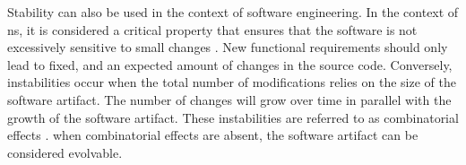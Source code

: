 Stability can also be used in the context of software engineering. In the context of
\gls{ns}, it is considered a critical property that ensures that the software is not
excessively sensitive to small changes \parencite[270]{mannaert_normalized_2016}. New
functional requirements should only lead to fixed, and an expected amount of changes in
the source code. Conversely, instabilities occur when the total number of modifications
relies on the size of the software artifact. The number of changes will grow over time in
parallel with the growth of the software artifact. These instabilities are referred to as
combinatorial effects \parencite[270]{mannaert_normalized_2016}. when combinatorial effects
are absent, the software artifact can be considered evolvable.